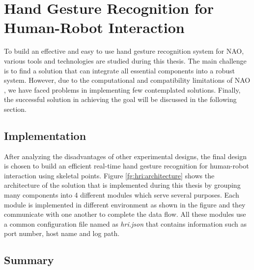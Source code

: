 \chapter{Hand Gesture Recognition for Human-Robot Interaction} \label{ch:solution} To build an effective and easy to use hand gesture recognition system for NAO, various tools and technologies are studied during this thesis. The main challenge is to find a solution that can integrate all essential components into a robust system. However, due to the computational and compatibility limitations of NAO \cite{17}, we have faced problems in implementing few contemplated solutions. Finally, the successful solution in achieving the goal will be discussed in the following section.

\section{Implementation} \label{sec:sol:impl} After analyzing the disadvantages of other experimental designs, the final design is chosen to build an efficient real-time hand gesture recognition for human-robot interaction using skeletal points. Figure \ref{fg:hri:architecture} shows the architecture of the solution that is implemented during this thesis by grouping many components into 4 different modules which serve several purposes. Each module is implemented in different environment as shown in the figure and they communicate with one another to complete the data flow. All these modules use a common configuration file named as \textit{hri.json} that contains information such as port number, host name and log path.




 







\section{Summary}